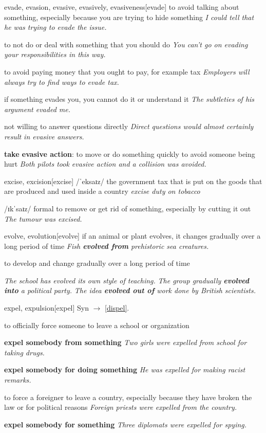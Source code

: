 \begin{DefWord}{evade, evasion, evasive, evasively, evasiveness}[evade]
    to avoid talking about something, especially because you are trying to hide something
    \textit{I could tell that he was trying to evade the issue.}

    to not do or deal with something that you should do
    \textit{You can't go on evading your responsibilities in this way.}

    to avoid paying money that you ought to pay, for example tax
    \textit{Employers will always try to find ways to evade tax.}

    if something evades you, you cannot do it or understand it
    \textit{The subtleties of his argument evaded me.}

    not willing to answer questions directly
    \textit{Direct questions would almost certainly result in evasive answers.}

    \textbf{take evasive action}: to move or do something quickly to avoid someone being hurt
    \textit{Both pilots took evasive action and a collision was avoided.}
\end{DefWord}

\begin{DefWord}{excise, excision}[excise]
    /ˈeksaɪz/ the government tax that is put on the goods that are produced and used inside a country
    \textit{excise duty on tobacco}

    /ɪkˈsaɪz/ formal to remove or get rid of something, especially by cutting it out
    \textit{The tumour was excised.}
\end{DefWord}

\begin{DefWord}{evolve, evolution}[evolve]
    if an animal or plant evolves, it changes gradually over a long period of time
    \textit{Fish \textbf{evolved from} prehistoric sea creatures.}

    to develop and change gradually over a long period of time

    \textit{The school has evolved its own style of teaching.}
    \textit{The group gradually \textbf{evolved into} a political party.}
    \textit{The idea \textbf{evolved out of} work done by British scientists.}
\end{DefWord}

\begin{DefWord}{expel, expulsion}[expel]
    Syn $\rightarrow$ \ref{dispel}.

    to officially force someone to leave a school or organization
    
    \textbf{expel somebody from something}
    \textit{Two girls were expelled from school for taking drugs.}

    \textbf{expel somebody for doing something}
    \textit{He was expelled for making racist remarks.}

    to force a foreigner to leave a country, especially because they have broken the law or for political reasons
    \textit{Foreign priests were expelled from the country.}

    \textbf{expel somebody for something}
    \textit{Three diplomats were expelled for spying.}
\end{DefWord}

